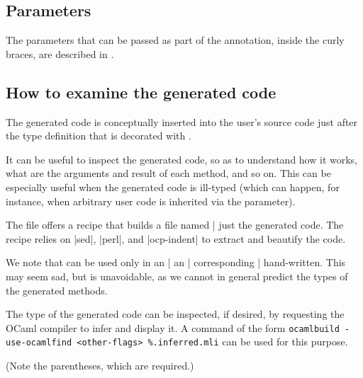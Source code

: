\documentclass[11pt,a4paper,twoside]{article}
\begin{document}
\subsection{Parameters}
\label{sec:ancestors}

The parameters that can be passed as part of the \derivingvisitors annotation,
inside the curly braces, are described in .


\subsection{How to examine the generated code}

The generated code is conceptually inserted into the user's source code just
after the type definition that is decorated with \derivingvisitors.

It can be useful to inspect the generated code, so as to understand how it
works, what are the arguments and result of each method, and so on. This can
be especially useful when the generated code is ill-typed (which can happen,
for instance, when arbitrary user code is inherited via the \ancestors
parameter).

The file  offers a recipe that builds a file
named \oc|%
just the generated code. The recipe relies on \oc|sed|, \oc|perl|, and
\oc|ocp-indent| to extract and beautify the code.

We note that \derivingvisitors can be used only in an \oc|%
an \oc|%
corresponding \oc|%
hand-written. This may seem sad, but is unavoidable, as we cannot in general
predict the types of the generated methods.

The type of the generated code can be inspected, if desired, by requesting the
OCaml compiler to infer and display it. A command of the form
\verb|ocamlbuild -use-ocamlfind <other-flags> %.inferred.mli| can be used for
this purpose.




\label{sec:regularity}

\label{sec:opaque}
(Note the parentheses, which are required.)




\end{document}
